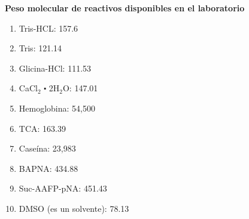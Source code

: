 \documentclass[12pt,a4paper]{article}
\begin{document}
\begin{multicols}{2}
\begin{Exercice}
\end{Exercice}

\begin{Exercice}\textbf{Peso molecular de reactivos disponibles en el laboratorio}
	\begin{enumerate}[1)]
		\item Tris-HCL: 157.6 
		\item Tris: 121.14 
		\item Glicina-HCl: 111.53
		\item CaCl$_2$ $\centerdot$ 2H$_2$O: 147.01
		\item Hemoglobina: 54,500
		\item TCA: 163.39
		\item Case\'ina: 23,983
		\item BAPNA: 434.88
		\item Suc-AAFP-pNA: 451.43
		\item DMSO (es un solvente): 78.13
	\end{enumerate}
\end{Exercice}

\end{multicols}
\end{document}

